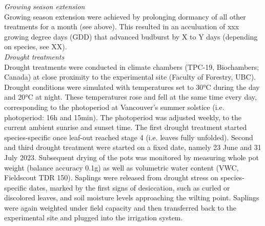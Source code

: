 \documentclass{article}
\begin{document}
	\textit{Growing season extension} \\
	Growing season extension were achieved by prolonging dormancy of all other treatments for a month (see above). This resulted in an acculuation of xxx growing degree days (GDD) that advanced budburst by X to Y days (depending on species, see XX).\\
	
	\textit{Drought treatments} \\
	Drought treatments were conducted in climate chambers (TPC-19, Biochambers; Canada) at close proximity to the experimental site (Faculty of Forestry, UBC). Drought conditions were simulated with temperatures set to 30°C during the day and 20°C at night. These temperatures rose and fell at the same time every day, corresponding to the photoperiod at Vancouver’s summer solstice (i.e. photoperiod: 16h and 15min). The photoperiod was adjusted weekly, to the current ambient sunrise and sunset time. 
	The first drought treatment started species-specific once leaf-out reached stage 4 (i.e. leaves fully unfolded). Second and third drought treatment were started on a fixed date, namely 23 June and 31 July 2023. Subsequent drying of the pots was monitored by measuring whole pot weight (balance accuracy 0.1g) as well as volumetric water content (VWC, Fieldscout TDR 150). Saplings were released from drought stress on species-specific dates, marked by the first signs of desiccation, such as curled or discolored leaves, and soil moisture levels approaching the wilting point. %
	Saplings were again weighted under field capacity and then transferred back to the experimental site and plugged into the irrigation system. \\
	
\end{document}
